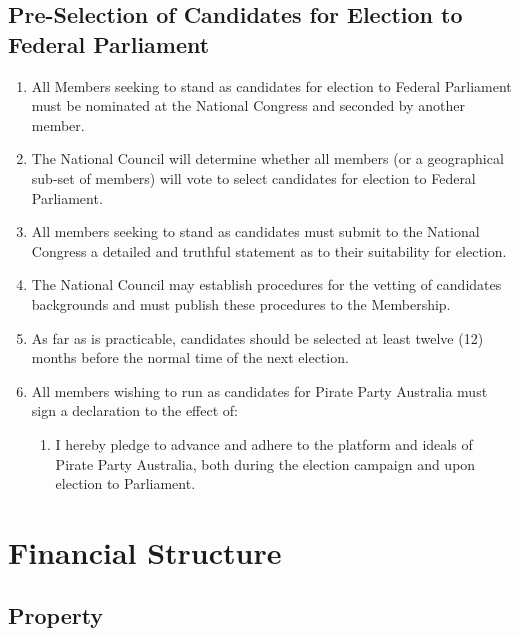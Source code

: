 \documentclass[a4paper,titlepage,8.5pt]{article}
\begin{document}
\subsection{Pre-Selection of Candidates for Election to Federal Parliament}

\begin{enumerate}
\item All Members seeking to stand as candidates for election to Federal Parliament must be nominated at the National Congress and seconded by another member.
\item The National Council will determine whether all members (or a geographical sub-set of members) will vote to select candidates for election to Federal Parliament.
\item All members seeking to stand as candidates must submit to the National Congress a detailed and truthful statement as to their suitability for election.
\item The National Council may establish procedures for the vetting of candidates backgrounds and must publish these procedures to the Membership. 
\item As far as is practicable, candidates should be selected at least twelve (12) months before the normal time of the next election.
\item All members wishing to run as candidates for Pirate Party Australia must sign a declaration to the effect of:
\begin{enumerate}
	\item I hereby pledge to advance and adhere to the platform and ideals of Pirate Party Australia, both during the election campaign and upon election to Parliament.
\end{enumerate}
\end{enumerate}

\section{Financial Structure}

\subsection{Property}
\end{document}
